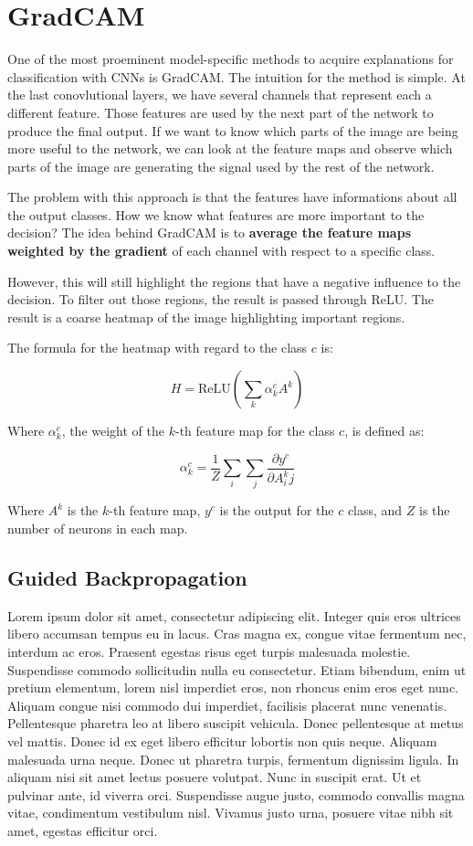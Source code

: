 \chapter{GradCAM}

One of the most proeminent model-specific methods to acquire explanations for classification with CNNs is GradCAM. The intuition for the method is simple. At the last conovlutional layers, we have several channels that represent each a different feature. Those features are used by the next part of the network to produce the final output. If we want to know which parts of the image are being more useful to the network, we can look at the feature maps and observe which parts of the image are generating the signal used by the rest of the network. 

The problem with this approach is that the features have informations about all the output classes. How we know what features are more important to the decision? The idea behind GradCAM is to \textbf{average the feature maps weighted by the gradient} of each channel with respect to a specific class. 

However, this will still highlight the regions that have a negative influence to the decision. To filter out those regions, the result is passed through ReLU. The result is a coarse heatmap of the image highlighting important regions.

The formula for the heatmap with regard to the class $c$ is:

\[
    H  = \text{ReLU}(\sum_k \alpha_k^c A^k)
\]

Where $\alpha_k^c$, the weight of the $k$-th feature map for the class $c$, is defined as:

\[
    \alpha_k^c=\frac{1}{Z} \sum_i \sum_j \frac{\partial y^c}{\partial A^k_ij}
\]

Where $A^k$ is the $k$-th feature map, $y^c$ is the output for the $c$ class, and $Z$ is the number of neurons in each map.

\section{Guided Backpropagation}
Lorem ipsum dolor sit amet, consectetur adipiscing elit. Integer quis eros ultrices libero accumsan tempus eu in lacus. Cras magna ex, congue vitae fermentum nec, interdum ac eros. Praesent egestas risus eget turpis malesuada molestie. Suspendisse commodo sollicitudin nulla eu consectetur. Etiam bibendum, enim ut pretium elementum, lorem nisl imperdiet eros, non rhoncus enim eros eget nunc. Aliquam congue nisi commodo dui imperdiet, facilisis placerat nunc venenatis. Pellentesque pharetra leo at libero suscipit vehicula. Donec pellentesque at metus vel mattis. Donec id ex eget libero efficitur lobortis non quis neque. Aliquam malesuada urna neque. Donec ut pharetra turpis, fermentum dignissim ligula. In aliquam nisi sit amet lectus posuere volutpat. Nunc in suscipit erat. Ut et pulvinar ante, id viverra orci. Suspendisse augue justo, commodo convallis magna vitae, condimentum vestibulum nisl. Vivamus justo urna, posuere vitae nibh sit amet, egestas efficitur orci. 
